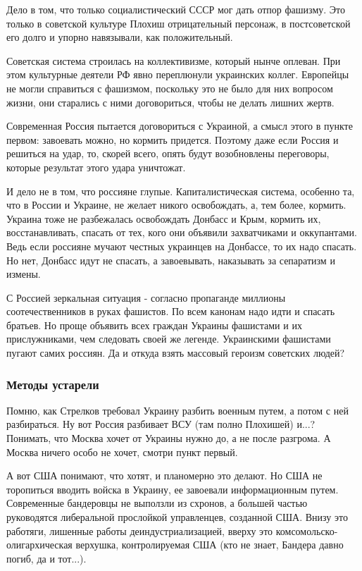 Дело в том, что только социалистический СССР мог дать отпор фашизму. Это только
в советской культуре Плохиш отрицательный персонаж, в постсоветской его долго и
упорно навязывали, как положительный. 

Советская система строилась на коллективизме, который нынче оплеван. При этом
культурные деятели РФ явно переплюнули украинских коллег. Европейцы не могли
справиться с фашизмом, поскольку это не было для них вопросом жизни, они
старались с ними договориться, чтобы не делать лишних жертв. 

Современная Россия пытается договориться с Украиной, а смысл этого в пункте
первом: завоевать можно, но кормить придется. Поэтому даже если Россия и
решиться на удар, то, скорей всего, опять будут возобновлены переговоры,
которые результат этого удара уничтожат.  

И дело не в том, что россияне глупые. Капиталистическая система, особенно та,
что в России и Украине, не желает никого освобождать, а, тем более, кормить.
Украина тоже не разбежалась освобождать Донбасс и Крым, кормить их,
восстанавливать, спасать от тех, кого они объявили захватчиками и оккупантами.
Ведь если россияне мучают честных украинцев на Донбассе, то их надо спасать. Но
нет, Донбасс идут не спасать, а завоевывать, наказывать за сепаратизм и измены. 

С Россией зеркальная ситуация - согласно пропаганде миллионы соотечественников
в руках фашистов. По всем канонам надо идти и спасать братьев. Но проще
объявить всех граждан Украины фашистами и их прислужниками, чем следовать своей
же легенде. Украинскими фашистами пугают самих россиян.   Да и откуда взять
массовый героизм советских людей?

\subsubsection{Методы устарели}

Помню, как Стрелков требовал Украину разбить военным путем, а потом с ней
разбираться. Ну вот Россия разбивает ВСУ (там полно Плохишей) и...? Понимать,
что Москва хочет от Украины нужно до, а не после разгрома. А Москва ничего
особо не хочет, смотри пункт первый. 

А вот США понимают, что хотят, и планомерно это делают. Но США не торопиться
вводить войска в Украину, ее завоевали информационным путем. Современные
бандеровцы не выползли из схронов, а большей частью руководятся либеральной
прослойкой управленцев, созданной США. Внизу это работяги, лишенные работы
деиндустриализацией,  вверху это комсомольско-олигархическая верхушка,
контролируемая США (кто не знает, Бандера давно погиб, да и тот...). 

